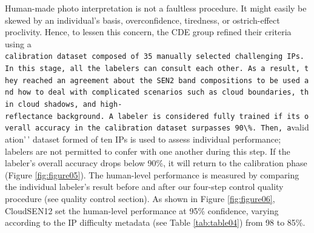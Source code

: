 \documentclass[a4paper, nobind]{templates/cdethesis}
\begin{document}
Human-made photo interpretation is not a faultless procedure. It might easily be skewed by an individual's basis, overconfidence, tiredness, or ostrich-effect\cite{Valdez2017} proclivity. Hence, to lessen this concern, the CDE group refined their criteria using a \texttt{calibration\textquotesingle{}\textquotesingle{}\ dataset\ composed\ of\ 35\ manually\ selected\ challenging\ IPs.\ In\ this\ stage,\ all\ the\ labelers\ can\ consult\ each\ other.\ As\ a\ result,\ they\ reached\ an\ agreement\ about\ the\ SEN2\ band\ compositions\ to\ be\ used\ and\ how\ to\ deal\ with\ complicated\ scenarios\ such\ as\ cloud\ boundaries,\ thin\ cloud\ shadows,\ and\ high-reflectance\ background.\ A\ labeler\ is\ considered\ fully\ trained\ if\ its\ overall\ accuracy\ in\ the\ calibration\ dataset\ surpasses\ 90\textbackslash{}\%.\ Then,\ a}validation'\,' dataset formed of ten IPs is used to assess individual performance; labelers are not permitted to confer with one another during this step. If the labeler's overall accuracy drops below 90\%, it will return to the calibration phase (Figure \ref{fig:figure05}). The human-level performance is measured by comparing the individual labeler's result before and after our four-step control quality procedure (see quality control section). As shown in Figure \ref{fig:figure06}, CloudSEN12 set the human-level performance at 95\% confidence, varying according to the IP difficulty metadata (see Table \ref{tab:table04}) from 98 to 85\%.
\end{document}
